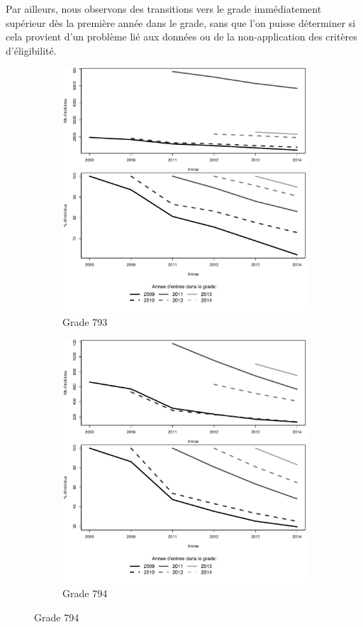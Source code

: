 \documentclass[11pt,a4paper]{article}
\begin{document}
Par ailleurs, nous observons des transitions vers le grade immédiatement supérieur dès la première année dans le grade, sans que l'on puisse déterminer si cela provient d'un problème lié aux données ou de la non-application des critères d'éligibilité. 


\begin{figure}[ht] 
  \caption{Survie dans le grade: Adjoints techniques}
  \label{surv_by_entry} 
  \begin{subfigure}[b]{0.5\linewidth}
      \caption{Grade 793} 
    \label{echelon_by_neg_793} 
    \centering
    \includegraphics[width=1\linewidth]{AT_survival_793.pdf} 
  \end{subfigure}%
  \begin{subfigure}[b]{0.5\linewidth}
        \caption{Grade 794} 
    \label{echelon_by_neg_794} 
    \centering
    \includegraphics[width=1\linewidth]{AT_survival_794.pdf} 

\end{subfigure}
\end{figure}
\end{document}
